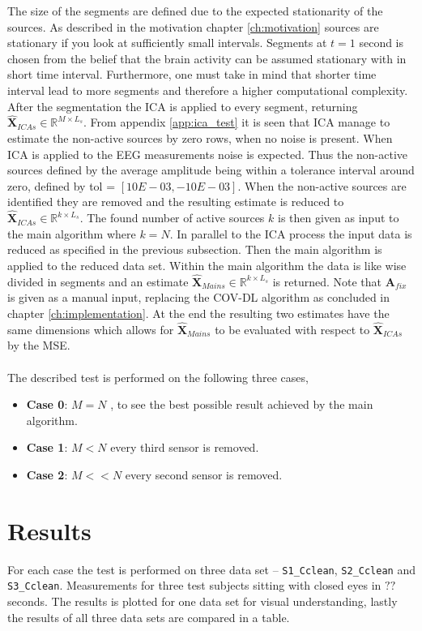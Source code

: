 The size of the segments are defined due to the expected stationarity of the sources. 
As described in the motivation chapter \ref{ch:motivation} sources are stationary if you look at sufficiently small intervals. 
Segments at $t = 1$ second is chosen from the belief that the brain activity can be assumed stationary with in short time interval.
Furthermore, one must take in mind that shorter time interval lead to more segments and therefore a higher computational complexity.   
After the segmentation the ICA is applied to every segment, returning $\hat{\textbf{X}}_{ICA s} \in \mathbb{R}^{M \times L_s}$.
From appendix \ref{app:ica_test} it is seen that ICA manage to estimate the non-active sources by zero rows, when no noise is present. 
When ICA is applied to the EEG measurements noise is expected. 
Thus the non-active sources defined by the average amplitude being within a tolerance interval around zero, defined by tol = $[10E-03, -10E-03]$. 
When the non-active sources are identified they are removed and the resulting estimate is reduced to $\hat{\textbf{X}}_{ICA s} \in \mathbb{R}^{k \times L_s}$. 
The found number of active sources $k$ is then given as input to the main algorithm where $k = N$. 
In parallel to the ICA process the input data is reduced as specified in the previous subsection. 
Then the main algorithm is applied to the reduced data set. 
Within the main algorithm the data is like wise divided in segments and an estimate $\hat{\textbf{X}}_{Main s} \in \mathbb{R}^{k \times L_s}$ is returned. 
Note that $\textbf{A}_{fix}$ is given as a manual input, replacing the COV-DL algorithm as concluded in chapter \ref{ch:implementation}.
At the end the resulting two estimates have the same dimensions which allows for $\hat{\textbf{X}}_{Main s}$ to be evaluated with respect to $\hat{\textbf{X}}_{ICA s}$ by the MSE.            
\\ \\
The described test is performed on the following three cases,
\begin{itemize}
\item \textbf{Case 0}: $M = N$ , to see the best possible result achieved by the main algorithm. 
\item \textbf{Case 1}: $M < N$ every third sensor is removed. 
\item \textbf{Case 2}: $M << N$ every second sensor is removed.
\end{itemize}

\section{Results}
For each case the test is performed on three data set -- \texttt{S1\_Cclean}, \texttt{S2\_Cclean} and \texttt{S3\_Cclean}. Measurements for three test subjects sitting with closed eyes in $??$ seconds.
The results is plotted for one data set for visual understanding, lastly the results of all three data sets are compared in a table.  

